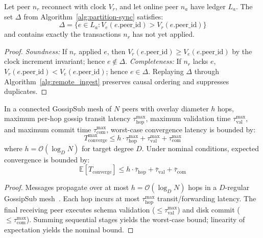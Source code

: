 \begin{proposition}
\label{prop:catchup}
Let peer $n_r$ reconnect with clock $V_r$, and let online peer $n_a$ have ledger $L_a$. The set $\Delta$ from Algorithm~\ref{alg:partition-sync} satisfies:
\[
\Delta = \{ e \in L_a : V_e(e.\text{peer\_id}) > V_r(e.\text{peer\_id}) \}
\]
and contains exactly the transactions $n_r$ has not yet applied.
\end{proposition}

\begin{proof}
\textit{Soundness:} If $n_r$ applied $e$, then $V_r(e.\text{peer\_id}) \geq V_e(e.\text{peer\_id})$ by the clock increment invariant; hence $e \notin \Delta$. \textit{Completeness:} If $n_r$ lacks $e$, $V_r(e.\text{peer\_id}) < V_e(e.\text{peer\_id})$; hence $e \in \Delta$. Replaying $\Delta$ through Algorithm~\ref{alg:remote_ingest} preserves causal ordering and suppresses duplicates.
\end{proof}

\begin{theorem}
\label{thm:convergence}
In a connected GossipSub mesh of $N$ peers with overlay diameter $h$ hops, maximum per-hop gossip transit latency $\tau_{\text{hop}}^{\max}$, maximum validation time $\tau_{\text{val}}^{\max}$, and maximum commit time $\tau_{\text{com}}^{\max}$, worst-case convergence latency is bounded by:
\begin{equation}
T_{\text{converge}}^{\max} \leq h \cdot \tau_{\text{hop}}^{\max} + \tau_{\text{val}}^{\max} + \tau_{\text{com}}^{\max}
\end{equation}
where $h = \mathcal{O}(\log_D N)$ for target degree $D$. Under nominal conditions, expected convergence is bounded by:
\begin{equation}
\mathbb{E}[T_{\text{converge}}] \leq h \cdot \bar{\tau}_{\text{hop}} + \bar{\tau}_{\text{val}} + \bar{\tau}_{\text{com}}
\end{equation}
\end{theorem}

\begin{proof}
Messages propagate over at most $h = \mathcal{O}(\log_D N)$ hops in a $D$-regular GossipSub mesh~\cite{vyzovitis2020gossipsub}. Each hop incurs at most $\tau_{\text{hop}}^{\max}$ transit/forwarding latency. The final receiving peer executes schema validation ($\le \tau_{\text{val}}^{\max}$) and disk commit ($\le \tau_{\text{com}}^{\max}$). Summing sequential stages yields the worst-case bound; linearity of expectation yields the nominal bound.
\end{proof}

